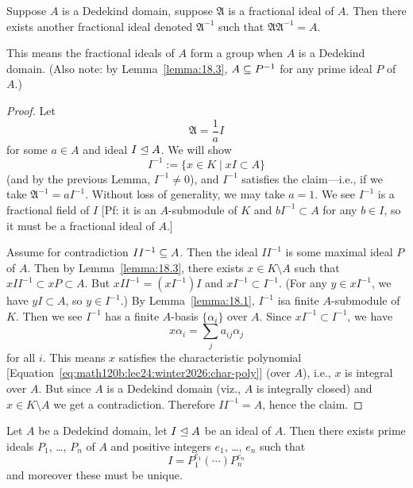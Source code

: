 \begin{proposition}\label{prop:18.4}
Suppose $A$ is a Dedekind domain, suppose $\mathfrak{A}$ is a
fractional ideal of $A$. Then there exists another fractional ideal
denoted $\mathfrak{A}^{-1}$ such that $\mathfrak{A}\mathfrak{A}^{-1}=A$.
\end{proposition}

This means the fractional ideals of $A$ form a group when $A$ is a
Dedekind domain. (Also note: by Lemma~\ref{lemma:18.3},
$A\propersubset P^{-1}$ for any prime ideal $P$ of $A$.)

\begin{proof}
Let
\begin{equation}
\mathfrak{A}=\frac{1}{a}I
\end{equation}
for some $a\in A$ and ideal $I\mathrel{\trianglelefteq} A$. We will show
\begin{equation}
I^{-1}:=\{x\in K\mid xI\subset A\}
\end{equation}
(and by the previous Lemma, $I^{-1}\neq0$), and $I^{-1}$ satisfies the
claim---i.e., if we take $\mathfrak{A}^{-1}=aI^{-1}$. Without loss of
generality, we may take $a=1$. We see $I^{-1}$ is a fractional field
of $I$ [Pf: it is an $A$-submodule of $K$ and $bI^{-1}\subset A$ for
  any $b\in I$, so it must be a fractional ideal of $A$.]

Assume for contradiction $II^{-1}\propersubset A$. Then the ideal
$II^{-1}$ is some maximal ideal $P$ of $A$. Then by
Lemma~\ref{lemma:18.3}, there exists $x\in K\setminus A$ such that
$xII^{-1}\subset xP\subset A$. But $xII^{-1}=(xI^{-1})I$ and
$xI^{-1}\subset I^{-1}$. (For any $y\in xI^{-1}$, we have $yI\subset A$,
so $y\in I^{-1}$.) By Lemma~\ref{lemma:18.1}, $I^{-1}$ isa finite
$A$-submodule of $K$. Then we see $I^{-1}$ has a finite $A$-basis
$\{\alpha_{i}\}$ over $A$. Since $xI^{-1}\subset I^{-1}$, we have
\begin{equation}\label{eq:math120b:lec24:winter2026:char-poly}
x\alpha_{i}=\sum_{j}a_{ij}\alpha_{j}
\end{equation}
for all $i$. This means $x$ satisfies the characteristic polynomial
[Equation~\eqref{eq:math120b:lec24:winter2026:char-poly}] (over $A$),
i.e., $x$ is integral over $A$. But since $A$ is a Dedekind domain
(viz., $A$ is integrally closed) and $x\in K\setminus A$ we get a
contradiction. Therefore $II^{-1}=A$, hence the claim.
\end{proof}

\begin{proposition}\label{prop:18.5}
Let $A$ be a Dedekind domain, let $I\mathrel{\trianglelefteq} A$ be an ideal of $A$.
Then there exists prime ideals $P_{1}$, \dots, $P_{n}$ of $A$ and
positive integers $e_{1}$, \dots, $e_{n}$ such that
\begin{equation}
I=P_{1}^{e_{1}}(\cdots)P_{n}^{e_{n}}
\end{equation}
and moreover these must be unique.
\end{proposition}

